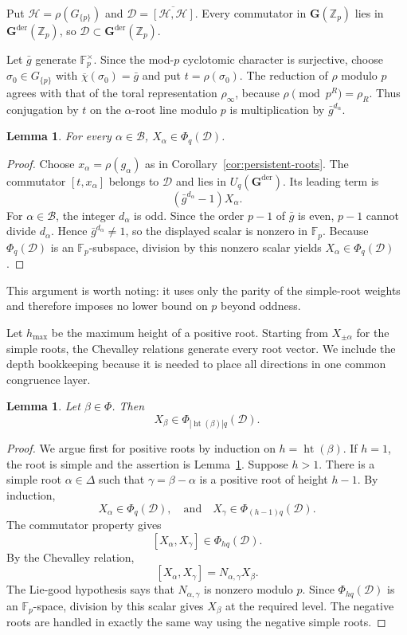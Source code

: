 \documentclass[11pt]{amsart}
\numberwithin{equation}{section}
\newcommand{\Fp}{\mathbb F_p}
\newcommand{\Zp}{\mathbb Z_p}
\newcommand{\chibar}{\overline\chi}
\newcommand{\GG}{\mathbf G}
\newcommand{\Gder}{\mathbf G^{\mathrm{der}}}
\newcommand{\Ht}{\operatorname{ht}}
\newtheorem{lemma}[theorem]{Lemma}
\theoremstyle{definition}
\begin{document}
Put $\mathcal H=\rho(G_{\{p\}})$ and $\mathcal D=\overline{[\mathcal H,\mathcal H]}$. Every commutator in $\GG(\Zp)$ lies in $\Gder(\Zp)$, so
$\mathcal D\subset\Gder(\Zp)$.

Let $\bar g$ generate $\Fp^\times$. Since the mod-$p$ cyclotomic
character is surjective, choose $\sigma_0\in G_{\{p\}}$ with
$\chibar(\sigma_0)=\bar g$ and put $t=\rho(\sigma_0)$.  The reduction
of $\rho$ modulo $p$ agrees with that of the toral representation
$\rho_\infty$, because $\rho\pmod{p^R}=\rho_R$.  Thus conjugation by
$t$ on the $\alpha$-root line modulo $p$ is multiplication by
$\bar g^{d_\alpha}$.

\begin{lemma}\label{lem:simple-roots-derived}
For every $\alpha\in\mathcal B$, $X_\alpha\in\Phi_q(\mathcal D)$.
\end{lemma}

\begin{proof}
Choose $x_\alpha=\rho(g_\alpha)$ as in
Corollary~\ref{cor:persistent-roots}.  The commutator
$[t,x_\alpha]$ belongs to $\mathcal D$ and lies in $U_q(\Gder)$.  Its
leading term is
\[
        (\bar g^{d_\alpha}-1)X_\alpha.
\]
For $\alpha\in\mathcal B$, the integer $d_\alpha$ is odd.  Since the
order $p-1$ of $\bar g$ is even, $p-1$ cannot divide $d_\alpha$.
Hence $\bar g^{d_\alpha}\neq1$, so the displayed scalar is nonzero in
$\Fp$.  Because $\Phi_q(\mathcal D)$ is an $\Fp$-subspace, division
by this nonzero scalar yields $X_\alpha\in\Phi_q(\mathcal D)$.
\end{proof}

This argument is worth noting: it uses only the parity of the
simple-root weights and therefore imposes no lower bound on $p$ beyond
oddness.

Let $h_{\max}$ be the maximum height of a positive root.  Starting from
$X_{\pm\alpha}$ for the simple roots, the Chevalley relations generate
every root vector.  We include the depth bookkeeping because it is
needed to place all directions in one common congruence layer.

\begin{lemma}\label{lem:all-root-vectors}
Let $\beta\in\Phi$. Then
\[
        X_\beta\in
        \Phi_{|\Ht(\beta)|q}(\mathcal D).
\]
\end{lemma}

\begin{proof}
We argue first for positive roots by induction on $h=\Ht(\beta)$.  If
$h=1$, the root is simple and the assertion is
Lemma~\ref{lem:simple-roots-derived}.  Suppose $h>1$.  There is a
simple root $\alpha\in\Delta$ such that
$\gamma=\beta-\alpha$ is a positive root of height $h-1$.  By
induction,
\[
        X_\alpha\in\Phi_q(\mathcal D),
        \quad\text{and}\quad
        X_\gamma\in\Phi_{(h-1)q}(\mathcal D).
\]
The commutator property gives
\[
 [X_\alpha,X_\gamma]
 \in\Phi_{hq}(\mathcal D).
\]
By the Chevalley relation,
\[
 [X_\alpha,X_\gamma]
 =N_{\alpha,\gamma}X_\beta.
\]
The Lie-good hypothesis says that
$N_{\alpha,\gamma}$ is nonzero modulo $p$.  Since
$\Phi_{hq}(\mathcal D)$ is an $\Fp$-space, division by this scalar
gives $X_\beta$ at the required level.  The negative roots are handled
in exactly the same way using the negative simple roots.
\end{proof}
\end{document}

